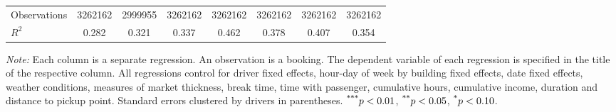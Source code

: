 \documentclass[reviewmode]{restat}
\begin{document}
\begin{table}[]
{\begin{tabularx}{\textwidth}{p{4cm}*{7}{S[table-format = 0.4, table-space-text-pre={**}, table-space-text-post={-**}]}}
        Observations        &\num{3262162}         &\num{2999955}         &\num{3262162}         &\num{3262162}         &\num{3262162}         &\num{3262162}         &\num{3262162}         \\
        \(R^2\)             & \num{0.282}         & \num{0.321}         & \num{0.337}         & \num{0.462}         & \num{0.378}         & \num{0.407}         & \num{0.354}         \\
        \bottomrule
		\end{tabularx}
		}
		\begin{tablenotes}
	    	\small
			\textit{Note:} Each column is a separate regression. An observation is a booking. The dependent variable of each regression is specified in the title of the respective column. All regressions control for driver fixed effects, hour-day of week by building fixed effects, date fixed effects, weather conditions, measures of market thickness, break time, time with passenger, cumulative hours, cumulative income, duration and distance to pickup point. Standard errors clustered by drivers in parentheses. $\textsuperscript{***}p < 0.01$, $\textsuperscript{**}p < 0.05$, $\textsuperscript{*}p < 0.10$.  
		\end{tablenotes}
\end{table}



\clearpage

\end{document}
